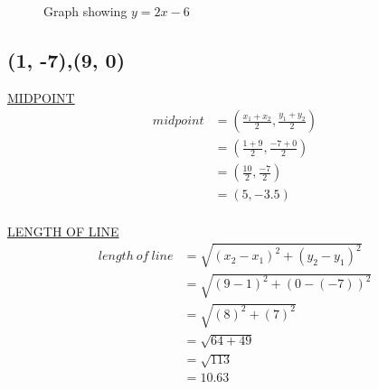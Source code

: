 \documentclass{article}
\begin{document}
\begin{description}
\begin{figure}[H]
\begin{center}
                \caption{\label{Graph-3}Graph showing $y=2x-6$}
            \end{center}
        \end{figure}
        \clearpage
        \subsection{(1, -7),(9, 0)}
        \underline{MIDPOINT}
        $$
            \begin{aligned}
                midpoint & = (\frac{x_1+x_2}{2}, \frac{y_1+y_2}{2}) \\
                         & = (\frac{1+9}{2}, \frac{-7+0}{2})        \\
                         & = (\frac{10}{2}, \frac{-7}{2})           \\
                         & = (5, -3.5)                              \\
            \end{aligned}
        $$

        \underline{LENGTH OF LINE}
        $$
            \begin{aligned}
                length \ of \ line & = \sqrt{(x_2-x_1)^2 + (y_2-y_1)^2} \\
                                   & = \sqrt{(9-1)^2 + (0-(-7))^2}      \\
                                   & = \sqrt{(8)^2 + (7)^2}             \\
                                   & = \sqrt{64 + 49}                   \\
                                   & = \sqrt{113}                       \\
                                   & = 10.63                            \\
            \end{aligned}
        $$


\end{description}
\end{document}
